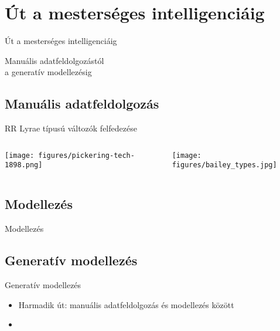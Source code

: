 \section{Út a mesterséges intelligenciáig}

\begin{frame}{}
    \centering
    \Huge{Út a mesterséges intelligenciáig}
    \hspace*{5cm}
    
    \Large{Manuális adatfeldolgozástól \\ a generatív modellezésig}
\end{frame}

\subsection{Manuális adatfeldolgozás}
\begin{frame}{RR Lyrae típusú változók felfedezése}
    \begin{columns}
        \begin{column}{0.45\textwidth}
            \texttt{[image: figures/pickering-tech-1898.png]}
        \end{column}
        \begin{column}{0.45\textwidth}
            \centering
            \texttt{[image: figures/bailey\_types.jpg]}
        \end{column}
    \end{columns}
    
\end{frame}

\subsection{Modellezés}
\begin{frame}{Modellezés}
    
\end{frame}

\subsection{Generatív modellezés}
\begin{frame}{Generatív modellezés}
    \begin{itemize}
        \item Harmadik út: manuális adatfeldolgozás és modellezés között
        \item
    \end{itemize}
\end{frame}